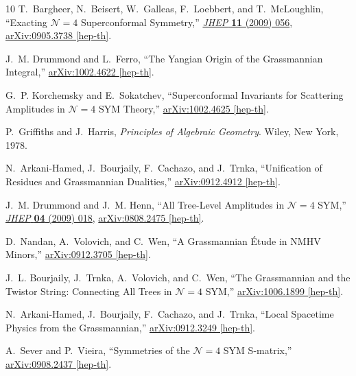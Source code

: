 \documentclass[11pt, reqno]{article}
\begin{document}
\begin{thebibliography}{10}
T.~Bargheer, N.~Beisert, W.~Galleas, F.~Loebbert, and T.~McLoughlin,
  ``{Exacting $\mathcal{N}=4$ Superconformal Symmetry},''
  \href{http://dx.doi.org/10.1088/1126-6708/2009/11/056}{{\em JHEP} {\bf 11}
  (2009)  056},
\href{http://arxiv.org/abs/0905.3738}{{ arXiv:0905.3738 [hep-th]}}.

J.~M. Drummond and L.~Ferro, ``{The Yangian {O}rigin of the Grassmannian
  {I}ntegral},''
\href{http://arxiv.org/abs/1002.4622}{{ arXiv:1002.4622 [hep-th]}}.

G.~P. Korchemsky and E.~Sokatchev, ``{Superconformal {I}nvariants for
  {S}cattering {A}mplitudes in $\mathcal{N}=4$ SYM {T}heory},''
\href{http://arxiv.org/abs/1002.4625}{{ arXiv:1002.4625 [hep-th]}}.

P.~Griffiths and J.~Harris, {\em Principles of Algebraic Geometry}.
\newblock Wiley, New York, 1978.

N.~Arkani-Hamed, J.~Bourjaily, F.~Cachazo, and J.~Trnka, ``{Unification of
  Residues and Grassmannian Dualities},''
\href{http://arxiv.org/abs/0912.4912}{{ arXiv:0912.4912 [hep-th]}}.

J.~M. Drummond and J.~M. Henn, ``{All Tree-Level Amplitudes in $\mathcal{N}=4$
  SYM},'' \href{http://dx.doi.org/10.1088/1126-6708/2009/04/018}{{\em JHEP}
  {\bf 04} (2009)  018},
\href{http://arxiv.org/abs/0808.2475}{{ arXiv:0808.2475 [hep-th]}}.

D.~Nandan, A.~Volovich, and C.~Wen, ``{A Grassmannian \'{E}tude in NMHV
  Minors},''
\href{http://arxiv.org/abs/0912.3705}{{ arXiv:0912.3705 [hep-th]}}.

J.~L. Bourjaily, J.~Trnka, A.~Volovich, and C.~Wen, ``{The Grassmannian and the
  Twistor String: Connecting All Trees in $\mathcal{N}=4$ SYM},''
\href{http://arxiv.org/abs/1006.1899}{{ arXiv:1006.1899 [hep-th]}}.

N.~Arkani-Hamed, J.~Bourjaily, F.~Cachazo, and J.~Trnka, ``{Local Spacetime
  Physics from the Grassmannian},''
\href{http://arxiv.org/abs/0912.3249}{{ arXiv:0912.3249 [hep-th]}}.

A.~Sever and P.~Vieira, ``{Symmetries of the $\mathcal{N}=4$ SYM S-matrix},''
\href{http://arxiv.org/abs/0908.2437}{{ arXiv:0908.2437 [hep-th]}}.


\end{thebibliography}
\end{document}
